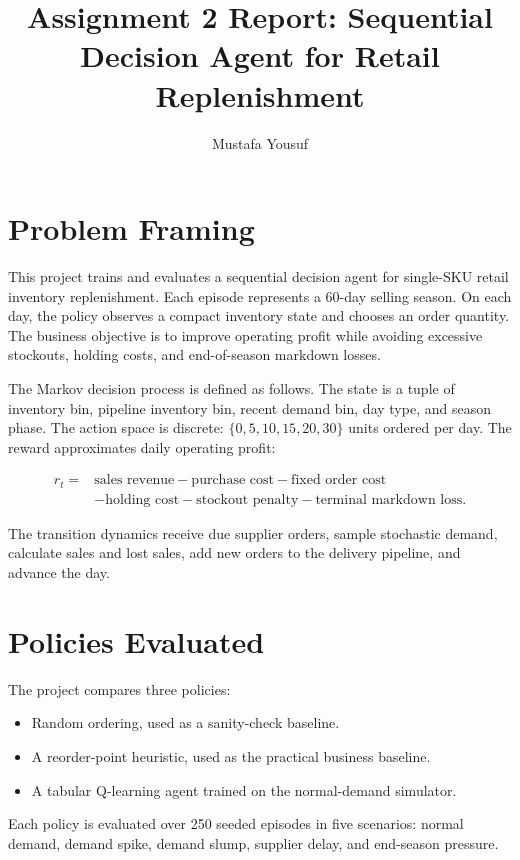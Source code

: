 \documentclass[11pt]{article}
\title{Assignment 2 Report: Sequential Decision Agent for Retail Replenishment}
\author{Mustafa Yousuf}
\date{}
\begin{document}
\maketitle

\section*{Problem Framing}

This project trains and evaluates a sequential decision agent for single-SKU retail inventory replenishment. Each episode represents a 60-day selling season. On each day, the policy observes a compact inventory state and chooses an order quantity. The business objective is to improve operating profit while avoiding excessive stockouts, holding costs, and end-of-season markdown losses.

The Markov decision process is defined as follows. The state is a tuple of inventory bin, pipeline inventory bin, recent demand bin, day type, and season phase. The action space is discrete: \(\{0, 5, 10, 15, 20, 30\}\) units ordered per day. The reward approximates daily operating profit:

\[
\begin{aligned}
r_t ={}& \text{sales revenue} - \text{purchase cost} - \text{fixed order cost} \\
&- \text{holding cost} - \text{stockout penalty} - \text{terminal markdown loss}.
\end{aligned}
\]

The transition dynamics receive due supplier orders, sample stochastic demand, calculate sales and lost sales, add new orders to the delivery pipeline, and advance the day.

\section*{Policies Evaluated}

The project compares three policies:

\begin{itemize}
    \item Random ordering, used as a sanity-check baseline.
    \item A reorder-point heuristic, used as the practical business baseline.
    \item A tabular Q-learning agent trained on the normal-demand simulator.
\end{itemize}

Each policy is evaluated over 250 seeded episodes in five scenarios: normal demand, demand spike, demand slump, supplier delay, and end-season pressure.
\end{document}

